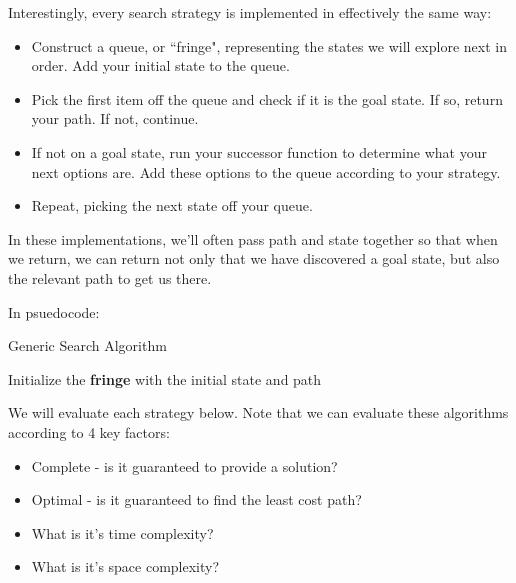 \documentclass[12pt]{article}
\begin{document}
Interestingly, every search strategy is implemented in effectively the same way:

\begin{itemize}
	\item Construct a queue, or ``fringe", representing the states we will explore next in order. Add your initial state to the queue.
	\item Pick the first item off the queue and check if it is the goal state. If so, return your path. If not, continue.
	\item If not on a goal state, run your successor function to determine what your next options are. Add these options to the queue according to your strategy.
	\item Repeat, picking the next state off your queue.
\end{itemize}

In these implementations, we'll often pass path and state together so that when we return, we can return not only that we have discovered a goal state, but also the relevant path to get us there.

In psuedocode:

\vspace{2em}

\begin{algorithm}[H]
\caption{Generic Search Algorithm}
Initialize the \textbf{fringe} with the initial state and path\;
\end{algorithm}

\vspace{2em}

We will evaluate each strategy below. Note that we can evaluate these algorithms according to 4 key factors:

\begin{itemize}
	\item Complete - is it guaranteed to provide a solution?
	\item Optimal - is it guaranteed to find the least cost path?
	\item What is it's time complexity?
	\item What is it's space complexity?
\end{itemize} 
\end{document}
